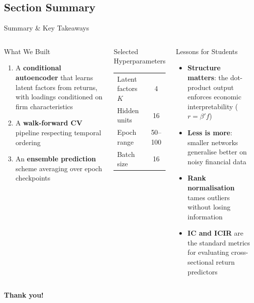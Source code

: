 \documentclass[aspectratio=169, 11pt]{beamer}
\begin{document}
\subsection{Section Summary}
%
\begin{frame}{Summary \& Key Takeaways}

\begin{columns}[T]
\small
\begin{block}{What We Built}
\begin{enumerate}
  \item A \textbf{conditional autoencoder} that learns latent factors from returns, with loadings conditioned on firm characteristics
  \item A \textbf{walk-forward CV} pipeline respecting temporal ordering
  \item An \textbf{ensemble prediction} scheme averaging over epoch checkpoints
\end{enumerate}
\end{block}
\vspace{-.2cm}
\begin{block}{Selected Hyperparameters}
\footnotesize
\centering
\begin{tabular}{lc}
\toprule
Latent factors $K$ & 4 \\
Hidden units & 16 \\
Epoch range & 50--100 \\
Batch size & 16 \\
\bottomrule
\end{tabular}
\end{block}

\begin{block}{Lessons for Students}
\begin{itemize}
  \item \textbf{Structure matters}: the dot-product output enforces economic interpretability ($r = \beta' f$)
  \item \textbf{Less is more}: smaller networks generalise better on noisy financial data
  \item \textbf{Rank normalisation} tames outliers without losing information
  \item \textbf{IC and ICIR} are the standard metrics for evaluating cross-sectional return predictors
\end{itemize}
\end{block}
\end{columns}

\vspace{0.3cm}
\centering
\Large\textbf{Thank you!}

\end{frame}
%
\end{document}
